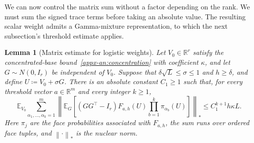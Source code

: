 \documentclass[11pt,letterpaper,twoside,leqno]{article}
\theoremstyle{bookplain}
\newtheorem{lemma}{Lemma}
\theoremstyle{bookremark}
\newcommand{\E}{\mathbb E}
\newcommand{\R}{\mathbb R}
\newcommand{\norm}[1]{\left\lVert#1\right\rVert}
\begin{document}
We can now control the matrix sum without a factor depending on the
rank. We must sum the signed trace terms before taking an absolute value.
The resulting scalar weight admits a Gamma-mixture representation,
to which the next subsection's threshold estimate applies.

\begin{lemma}[Matrix estimate for logistic weights]
\label{appx-an:lem:matrix}
Let \(V_0\in\R^r\) satisfy the concentrated-base
bound~\eqref{appx-an:concentration}{ with coefficient \(\kappa\)}, and let \(G\sim N(0,I_r)\) be
independent of \(V_0\). Suppose that
\(\delta\sqrt L\le\sigma\le1\) and \(h\ge\delta\), and {define}
\(U\coloneqq V_0+\sigma G\). There is an absolute constant
\(C_1\ge1\) such that, for every threshold vector \(a\in\R^m\)
and every integer \(k\ge1\),
\begin{equation}
 \E_{V_0}\sum_{\alpha_1,\ldots,\alpha_k=1}^m
 \left\|\E_G\left[(GG^\top-I_r)F_{a,h}(U)
              \prod_{b=1}^k\pi_{\alpha_b}(U)\right]\right\|_*
 \le C_1^{k+1}h{\kappa L}.
 \label{appx-an:matrix-bound}
\end{equation}
Here \(\pi_j\) are the face probabilities associated with
\(F_{a,h}\), the sum runs over ordered face tuples, and
\(\norm{\cdot}_*\) is the nuclear norm.
\end{lemma}
\end{document}
